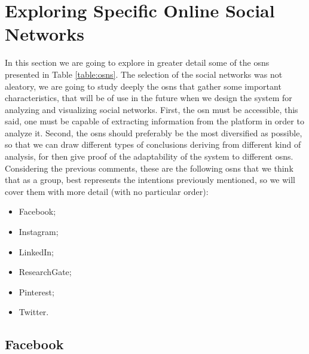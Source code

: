 \section{Exploring Specific Online Social Networks}

In this section we are going to explore in greater detail some of the \glspl{osn} presented
in Table \ref{table:osns}. The selection of the social networks was not aleatory, we are going
to study deeply the \glspl{osn} that gather some important characteristics, that will be of use in
the future when we design the system for analyzing and visualizing social networks. First, the
\gls{osn} must be accessible, this said, one must be capable of extracting information from the platform
in order to analyze it. Second, the \glspl{osn} should preferably be the most diversified as possible, so that we
can draw different types of conclusions deriving from different kind of analysis, for then give proof
of the adaptability of the system to different \glspl{osn}. Considering the previous
comments, these are the following \glspl{osn} that we think that as a group, best represents the intentions
previously mentioned, so we will cover them with more detail (with no particular order):
\begin{itemize}
  \item Facebook;
  \item Instagram;
  \item LinkedIn;
  \item ResearchGate;
  \item Pinterest;
  \item Twitter.
\end{itemize}

\subsection{Facebook}

